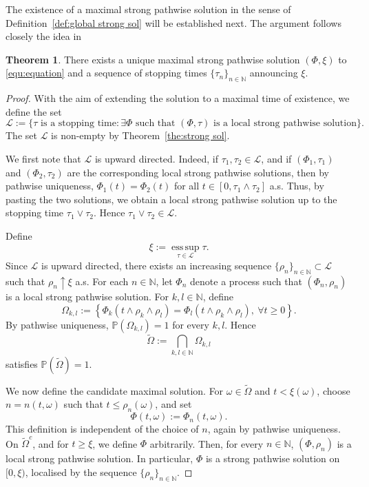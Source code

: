 \documentclass[11pt, reqno]{amsart}
\theoremstyle{definition}
\newtheorem{theorem}{Theorem}[section]
\numberwithin{equation}{section}
\newcommand{\bb}{\mathbb}
\begin{document}
The existence of a maximal strong pathwise solution in the sense of Definition~\ref{def:global strong sol} will be established next. The argument follows closely the idea in~\cite[Section~5.3.4]{BreFeiHof18}

\begin{theorem}\label{the:max strong sol}
	There exists a unique maximal strong pathwise solution $(\Phi,\xi)$ to \eqref{equ:equation} and a sequence of stopping times $\{\tau_n\}_{n\in\bb{N}}$ announcing $\xi$. 
\end{theorem}

\begin{proof}
	With the aim of extending the solution to a maximal time of existence, we
	define the set
	\[
	\mathcal{L}:= \{\tau \text{ is a stopping time}: \exists \Phi
	\text{ such that } (\Phi,\tau) \text{ is a local strong pathwise solution} \}.
	\]
	The set $\mathcal{L}$ is non-empty by Theorem~\ref{the:strong sol}.
	
	We first note that $\mathcal L$ is upward directed. Indeed, if
	$\tau_1,\tau_2\in\mathcal L$, and if $(\Phi_1,\tau_1)$ and
	$(\Phi_2,\tau_2)$ are the corresponding local strong pathwise solutions,
	then by pathwise uniqueness, $\Phi_1(t)=\Phi_2(t)$ for all $t\in [0, \tau_1\wedge\tau_2]$ a.s.
	Thus, by pasting the two solutions, we obtain a local strong pathwise
	solution up to the stopping time $\tau_1\vee\tau_2$. Hence
	$\tau_1\vee\tau_2\in\mathcal L$.
	
	Define
	\[
	\xi:=\operatorname*{ess\,sup}_{\tau\in\mathcal L}\tau .
	\]
	Since $\mathcal L$ is upward directed, there exists an increasing sequence
	$\{\rho_n\}_{n\in\mathbb N}\subset\mathcal L$ such that $\rho_n\uparrow \xi$ a.s.
	For each $n\in\mathbb N$, let $\Phi_n$ denote a process such that
	$(\Phi_n,\rho_n)$ is a local strong pathwise solution. For $k,l\in\mathbb N$,
	define
	\[
	\Omega_{k,l}
	:=
	\left\{
	\Phi_k(t\wedge\rho_k\wedge\rho_l)
	=
	\Phi_l(t\wedge\rho_k\wedge\rho_l),
	\ \forall t\geq0
	\right\}.
	\]
	By pathwise uniqueness, $\mathbb P(\Omega_{k,l})=1$ for every $k,l$.
	Hence
	\[
	\widetilde\Omega:=\bigcap_{k,l\in\mathbb N}\Omega_{k,l}
	\]
	satisfies $\mathbb P(\widetilde\Omega)=1$.
	
	We now define the candidate maximal solution. For
	$\omega\in\widetilde\Omega$ and $t<\xi(\omega)$, choose
	$n=n(t,\omega)$ such that $t\leq\rho_n(\omega)$, and set
	\[
	\Phi(t,\omega):=\Phi_n(t,\omega).
	\]
	This definition is independent of the choice of $n$, again by pathwise
	uniqueness. On $\widetilde\Omega^c$, and for $t\geq\xi$, we define $\Phi$
	arbitrarily. Then, for every $n\in\mathbb N$, $(\Phi,\rho_n)$
	is a local strong pathwise solution. In particular, $\Phi$ is a strong pathwise solution on $[0,\xi)$, localised by the sequence $\{\rho_n\}_{n\in\mathbb N}$.
	

\end{proof}
\end{document}
